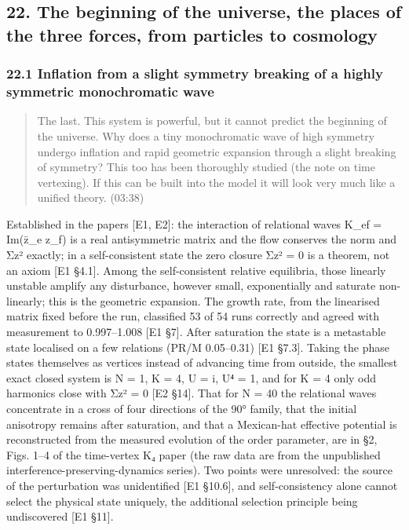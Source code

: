 \documentclass[
  a4paper,
]{article}
\begin{document}
\subsection{22. The beginning of the universe, the places of the three
forces, from particles to
cosmology}\label{the-beginning-of-the-universe-the-places-of-the-three-forces-from-particles-to-cosmology}

\subsubsection{22.1 Inflation from a slight symmetry breaking of a
highly symmetric monochromatic
wave}\label{inflation-from-a-slight-symmetry-breaking-of-a-highly-symmetric-monochromatic-wave}

\begin{quote}
The last. This system is powerful, but it cannot predict the beginning
of the universe. Why does a tiny monochromatic wave of high symmetry
undergo inflation and rapid geometric expansion through a slight
breaking of symmetry? This too has been thoroughly studied (the note on
time vertexing). If this can be built into the model it will look very
much like a unified theory. (03:38)
\end{quote}

Established in the papers {[}E1, E2{]}: the interaction of relational
waves K\_ef = Im(z̄\_e z\_f) is a real antisymmetric matrix and the flow
conserves the norm and Σz² exactly; in a self-consistent state the zero
closure Σz² = 0 is a theorem, not an axiom {[}E1 §4.1{]}. Among the
self-consistent relative equilibria, those linearly unstable amplify any
disturbance, however small, exponentially and saturate non-linearly;
this is the geometric expansion. The growth rate, from the linearised
matrix fixed before the run, classified 53 of 54 runs correctly and
agreed with measurement to 0.997--1.008 {[}E1 §7{]}. After saturation
the state is a metastable state localised on a few relations (PR/M
0.05--0.31) {[}E1 §7.3{]}. Taking the phase states themselves as
vertices instead of advancing time from outside, the smallest exact
closed system is N = 1, K = 4, U = i, U⁴ = 1, and for K = 4 only odd
harmonics close with Σz² = 0 {[}E2 §14{]}. That for N = 40 the
relational waves concentrate in a cross of four directions of the 90°
family, that the initial anisotropy remains after saturation, and that a
Mexican-hat effective potential is reconstructed from the measured
evolution of the order parameter, are in §2, Figs. 1--4 of the
time-vertex K₄ paper (the raw data are from the unpublished
interference-preserving-dynamics series). Two points were unresolved:
the source of the perturbation was unidentified {[}E1 §10.6{]}, and
self-consistency alone cannot select the physical state uniquely, the
additional selection principle being undiscovered {[}E1 §11{]}.
\end{document}
